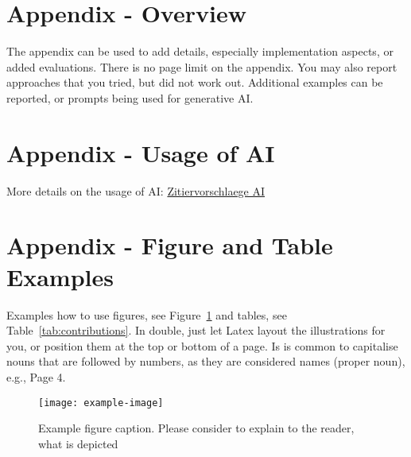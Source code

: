 \documentclass[12pt,a4paper,twocolumn]{article}
\begin{document}



\appendix

\section{Appendix - Overview}

The appendix can be used to add details, especially implementation aspects, or added evaluations.
There is no page limit on the appendix.
You may also report approaches that you tried, but did not work out.
Additional examples can be reported, or prompts being used for generative AI.

\section{Appendix - Usage of AI}
More details on the usage of AI: \href{https://www.tugraz.at/fileadmin/Studierende\_und\_Bedienstete/Information/Unsere\_TU\_Graz/Lehre\_an\_der\_TU\_Graz/Zitiervorschlaege_KI.pdf}{Zitiervorschlaege AI}

\section{Appendix - Figure and Table Examples}
Examples how to use figures, see Figure~\ref{fig:example} and tables, see Table~\ref{tab:contributions}.
In double, just let Latex layout the illustrations for you, or position them at the top or bottom of a page.
Is is common to capitalise nouns that are followed by numbers, as they are considered names (proper noun), e.g., Page 4.

\begin{figure}
    \centering
        \texttt{[image: example-image]}
    \caption{Example figure caption. Please consider to explain to the reader, what is depicted}
    \label{fig:example}
\end{figure}
\end{document}
